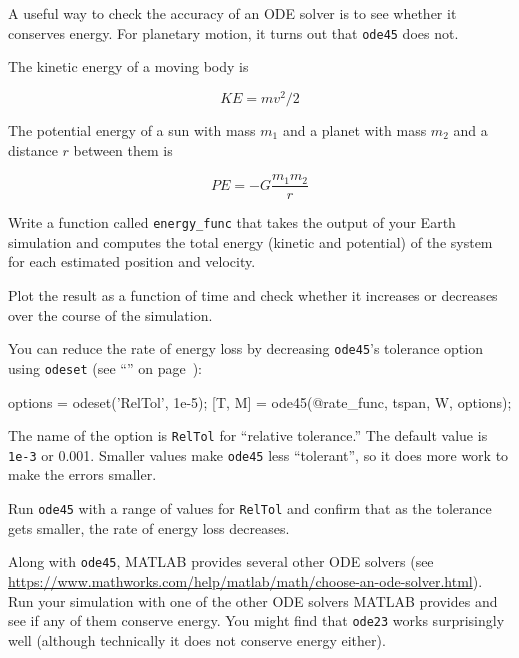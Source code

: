A useful way to check the accuracy of an ODE solver is to see whether it conserves energy.  For planetary motion, it turns out that {\tt ode45} does not.


The kinetic energy of a moving body is

\begin{equation*}
KE = m v^2 / 2
\end{equation*}

The potential energy of a sun with mass $m_1$ and a
planet with mass $m_2$ and a distance $r$ between them is

\begin{equation}
PE = -G \frac{m_1 m_2}{r}
\end{equation}

Write a function called {\tt energy\_func} that takes the output of
your Earth simulation and computes the total
energy (kinetic and potential) of the system for each estimated
position and velocity.

Plot the result as a function of time and
check whether it increases or decreases over the course of the simulation.


You can reduce the rate of energy loss by decreasing {\tt ode45}'s
tolerance option using {\tt odeset} (see ``'' on page~\pageref{events}):

\begin{code}
options = odeset('RelTol', 1e-5);
[T, M] = ode45(@rate_func, tspan, W, options);
\end{code}

The name of the option is {\tt RelTol} for ``relative tolerance.''
The default value is {\tt 1e-3} or 0.001.  Smaller values
make {\tt ode45} less ``tolerant'', so it does more work to
make the errors smaller.


Run {\tt ode45} with a range of values for {\tt RelTol} and confirm
that as the tolerance gets smaller, the rate of energy loss
decreases.


Along with {\tt ode45}, MATLAB provides several other ODE solvers 
(see \url{https://www.mathworks.com/help/matlab/math/choose-an-ode-solver.html}).
Run your simulation with one of the other ODE solvers MATLAB provides
and see if any of them conserve energy.  You might find that {\tt ode23} works surprisingly well (although technically it does not conserve energy either).


